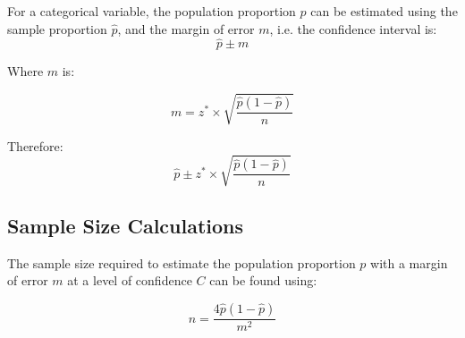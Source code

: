 \documentclass[12pt letter]{report}
\begin{document}
For a categorical variable, the population proportion $p$ can be estimated using the sample proportion $\hat{p}$, and the
margin of error $m$, i.e. the confidence interval is:
\[
  \hat{p} \pm m
\]

Where $m$ is:

\[
  m = z^* \times \sqrt{\frac{\hat{p}(1-\hat{p})}{n}}
\]

Therefore:
\[
  \hat{p} \pm z^* \times \sqrt{\frac{\hat{p}\left( 1 - \hat{p} \right) }{n}}
\]

\subsection{Sample Size Calculations}

The sample size required to estimate the population proportion $p$ with a margin of error $m$ at a level of confidence
$C$ can be found using:

\[
  n = \frac{4\hat{p} \left( 1 - \hat{p} \right) }{m^2}
\]
\end{document}
